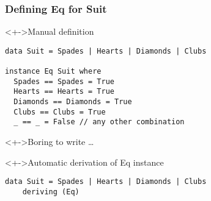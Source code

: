 \documentclass{beamer}
\begin{document}
\begin{frame}[fragile]
  \frametitle{Defining Eq for Suit}
  \begin{block}<+->{Manual definition}
\begin{lstlisting}
data Suit = Spades | Hearts | Diamonds | Clubs

instance Eq Suit where
  Spades == Spades = True
  Hearts == Hearts = True
  Diamonds == Diamonds = True
  Clubs == Clubs = True
  _ == _ = False // any other combination
\end{lstlisting}
  \end{block}
  \begin{alertblock}<+->{Boring to write \dots}
    
  \end{alertblock}
  \begin{block}<+->{Automatic derivation of Eq instance}
\begin{lstlisting}
data Suit = Spades | Hearts | Diamonds | Clubs
    deriving (Eq)
\end{lstlisting}
  \end{block}
\end{frame}
\end{document}
